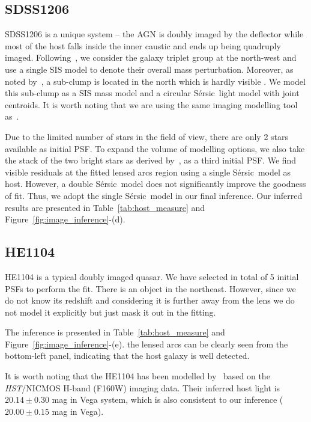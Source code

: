 \documentclass[fleqn,usenatbib]{mnras}
\newcommand{\hst}{{\it HST}}
\newcommand{\sersic}{S\'ersic}
\begin{document}
{\subsection{SDSS1206}
SDSS1206 is a unique system -- the AGN is doubly imaged by the deflector while most of the host falls inside the inner caustic and ends up being quadruply imaged. Following~\citet{Birrer2019}, we consider the galaxy triplet group at the north-west and use a single SIS model to denote their overall mass perturbation. Moreover, as noted by~\citet{Birrer2019}, a sub-clump is located in the north which is hardly visible \citep[see Figure~1 in][]{Birrer2019}. We model this sub-clump as a SIS mass model and a circular \sersic\ light model with joint centroids. It is worth noting that we are using the same imaging modelling tool as~\citet{Birrer2019}.

Due to the limited number of stars in the field of view, there are only 2 stars available as initial PSF. To expand the volume of modelling options, we also take the stack of the two bright stars as derived by~\citet{Birrer2019}, as a third initial PSF. We find visible residuals at the fitted lensed arcs region using a single \sersic\ model as host. However, a double \sersic\ model does not significantly improve the goodness of fit. Thus, we adopt the single \sersic\ model in our final inference. Our inferred results are presented in Table~\ref{tab:host_measure} and Figure~\ref{fig:image_inference}-(d).


\subsection{HE1104}
HE1104 is a typical doubly imaged quasar. We have selected in total of 5 initial PSFs to perform the fit. There is an object in the northeast. However, since we do not know its redshift and considering it is further away from the lens we do not model it explicitly but just mask it out in the fitting.

The inference is presented in Table~\ref{tab:host_measure} and Figure~\ref{fig:image_inference}-(e). the lensed arcs can be clearly seen from the bottom-left panel, indicating that the host galaxy is well detected.

It is worth noting that the HE1104 has been modelled by~\citet{Peng2006} based on the \hst/NICMOS H-band (F160W) imaging data. Their inferred host light is $20.14\pm0.30$ mag in Vega system, which is also consistent to our inference ($20.00\pm0.15$ mag in Vega).

}
\end{document}
